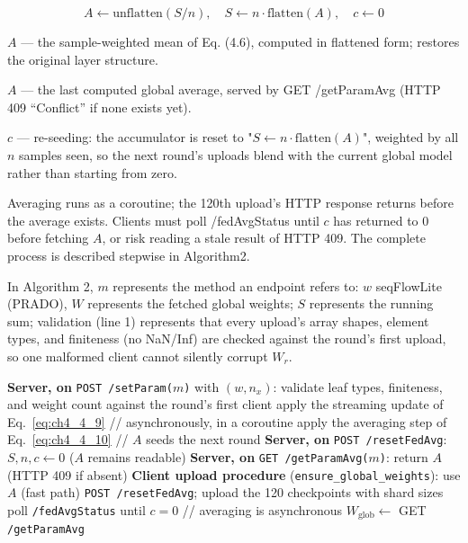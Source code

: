 \begin{equation}
  A \leftarrow \text{unflatten}(S/n), \quad S \leftarrow n \cdot \text{flatten}(A), \quad c \leftarrow 0
  \label{eq:ch4_4_8}
\end{equation}

$A$ --- the sample-weighted mean of Eq. (4.6), computed in flattened form; restores the original layer structure.

$A$ --- the last computed global average, served by GET /getParamAvg (HTTP 409 ``Conflict'' if none exists yet).

$c$ --- re-seeding: the accumulator is reset to "$S \leftarrow n \cdot \text{flatten}(A)$", weighted by all $n$ samples seen, so the next round's uploads blend with the current global model rather than starting from zero.

Averaging runs as a coroutine; the 120th upload’s HTTP response returns before the average exists. Clients must poll /fedAvgStatus until $c$ has returned to $0$ before fetching $A$, or risk reading a stale result of HTTP 409. The complete process is described stepwise in Algorithm2.

In Algorithm 2, $m$ represents the method an endpoint refers to: $w$ seqFlowLite (PRADO), $W$ represents the fetched global weights; $S$ represents the running sum; validation (line 1) represents that every upload’s array shapes, element types, and finiteness (no NaN/Inf) are checked against the round’s first upload, so one malformed client cannot silently corrupt $W_r$.

\begin{algorithm}[htbp]
\caption{Streaming weighted FedAvg on MLServer, and the client protocol. All locally trained model parameters, uploaded by clients, are first validated by the server to ensure consistency. The next step performs a streaming update (Eq.~\ref{eq:ch4_4_9}), i.e., received model weights are added to the aggregation buffer. This process continues until updates for all clients are received. Once updates from all clients are received, the buffered FedAvg is performed to generate new global weights.}
\label{alg:ch4_alg2}
\begin{algorithmic}[1]
\State \textbf{Server, on} \texttt{POST /setParam($m$)} with $(w, n_x)$:
\State \quad validate leaf types, finiteness, and weight count against the round's first client
\State \quad apply the streaming update of Eq.~\ref{eq:ch4_4_9}
 \hfill // asynchronously, in a coroutine
\State \quad apply the averaging step of Eq.~\ref{eq:ch4_4_10} \hfill // $A$ seeds the next round
\EndIf
\State \textbf{Server, on} \texttt{POST /resetFedAvg}: $S, n, c \leftarrow 0$ ($A$ remains readable)
\State \textbf{Server, on} \texttt{GET /getParamAvg($m$)}: return $A$ (HTTP 409 if absent)
\State \textbf{Client upload procedure} (\texttt{ensure\_global\_weights}):
\State \quad use $A$ (fast path)
\Else
\State \quad \texttt{POST /resetFedAvg}; upload the 120 checkpoints with shard sizes
\State \quad poll \texttt{/fedAvgStatus} until $c = 0$ \hfill // averaging is asynchronous
\State \quad $W_{\text{glob}} \leftarrow$ GET \texttt{/getParamAvg}
\EndIf
\end{algorithmic}
\end{algorithm}

